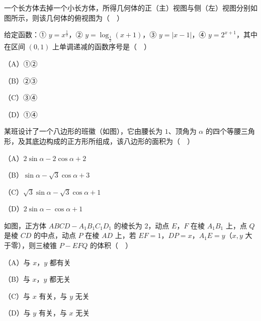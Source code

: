\begingroup
\renewenvironment{question}{\Needspace{0.5\textheight}}{}
\begin{question}
一个长方体去掉一个小长方体，所得几何体的正（主）视图与侧（左）视图分别如图所示，则该几何体的俯视图为（　）
\nopagebreak[4]
\begin{center}\end{center}
\nopagebreak[4]
\end{question}
\endgroup
\begin{question}
给定函数：① $y=x^{\frac12}$，② $y=\log_{\frac12}(x+1)$，③ $y=|x-1|$，④ $y=2^{x+1}$，其中在区间 $(0,1)$ 上单调递减的函数序号是（　）

（A）①②

（B）②③

（C）③④

（D）①④

\Needspace{0.4\textheight}
\end{question}
\begingroup
\renewenvironment{question}{\Needspace{0.5\textheight}}{}
\begin{question}
某班设计了一个八边形的班徽（如图），它由腰长为 $1$、顶角为 $\alpha$ 的四个等腰三角形，及其底边构成的正方形所组成，该八边形的面积为（　）

（A）$2\sin\alpha-2\cos\alpha+2$

（B）$\sin\alpha-\sqrt3\cos\alpha+3$

（C）$\sqrt3\sin\alpha-\sqrt3\cos\alpha+1$

（D）$2\sin\alpha-\cos\alpha+1$
\nopagebreak[4]
\begin{center}\end{center}
\nopagebreak[4]
\Needspace{0.4\textheight}
\end{question}
\endgroup
\begingroup
\renewenvironment{question}{\Needspace{0.5\textheight}}{}
\begin{question}
如图，正方体 $ABCD-A_1B_1C_1D_1$ 的棱长为 $2$，动点 $E$，$F$ 在棱 $A_1B_1$ 上，点 $Q$ 是棱 $CD$ 的中点，动点 $P$ 在棱 $AD$ 上，若 $EF=1$，$DP=x$，$A_1E=y$（$x,y$ 大于零），则三棱锥 $P-EFQ$ 的体积（　）

（A）与 $x$，$y$ 都有关

（B）与 $x$，$y$ 都无关

（C）与 $x$ 有关，与 $y$ 无关

（D）与 $y$ 有关，与 $x$ 无关
\nopagebreak[4]
\begin{center}\end{center}
\nopagebreak[4]
\end{question}
\endgroup
{}

